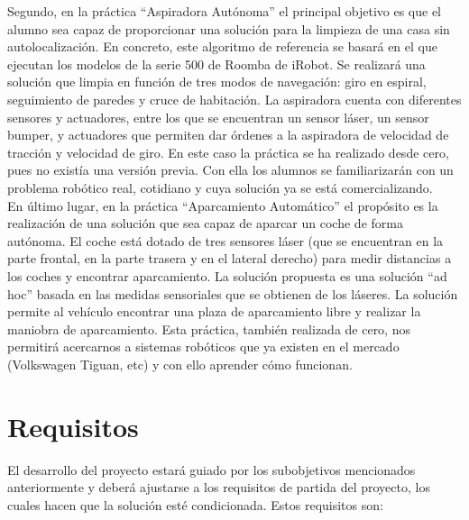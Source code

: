 Segundo, en la práctica ``Aspiradora Autónoma'' el principal objetivo es que el alumno sea capaz de proporcionar una solución para la limpieza de una casa sin autolocalización. En concreto, este algoritmo de referencia se basará en el que ejecutan los modelos de la serie 500 de Roomba de iRobot. Se realizará una solución que limpia en función de tres modos de navegación: giro en espiral, seguimiento de paredes y cruce de habitación. La aspiradora cuenta con diferentes sensores y actuadores, entre los que se encuentran un sensor láser, un sensor bumper, y actuadores que permiten dar órdenes a la aspiradora de velocidad de tracción y velocidad de giro.  En este caso la práctica se ha realizado desde cero, pues no existía una versión previa. Con ella los alumnos se familiarizarán con un problema robótico real, cotidiano y cuya solución ya se está comercializando.\\


En último lugar, en la práctica ``Aparcamiento Automático'' el propósito es la realización de una solución que sea capaz de aparcar un coche de forma autónoma. El coche está dotado de tres sensores láser (que se encuentran en la parte frontal, en la parte trasera y en el lateral derecho) para medir distancias a los coches y encontrar aparcamiento. La solución propuesta es una solución ``ad hoc'' basada en las medidas sensoriales que se obtienen de los láseres. La solución permite al vehículo encontrar una plaza de aparcamiento libre y realizar la maniobra de aparcamiento. Esta práctica, también realizada de cero, nos permitirá acercarnos a sistemas robóticos que ya existen en el mercado (Volkswagen Tiguan, etc) y con ello aprender cómo funcionan.

\section{Requisitos}
El desarrollo del proyecto estará guiado por los subobjetivos mencionados anteriormente y deberá ajustarse a los requisitos de partida del proyecto, los cuales hacen que la solución esté condicionada. Estos requisitos son:


